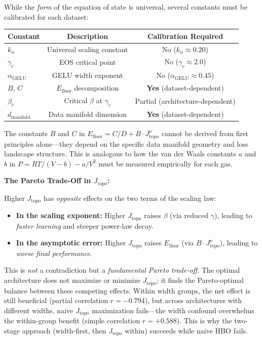 \documentclass[11pt, a4paper]{article}
\theoremstyle{plain}
\begin{document}
While the \emph{form} of the equation of state is universal, several constants must be calibrated for each dataset:

\begin{center}
\begin{tabular}{lcc}
\toprule
Constant & Description & Calibration Required \\
\midrule
$k_\alpha$ & Universal scaling constant & No ($k_\alpha \approx 0.20$) \\
$\gamma_c$ & EOS critical point & No ($\gamma_c \approx 2.0$) \\
$\alpha_{\mathrm{GELU}}$ & GELU width exponent & No ($\alpha_{\mathrm{GELU}} \approx 0.45$) \\
$B$, $C$ & $E_{\mathrm{floor}}$ decomposition & \textbf{Yes} (dataset-dependent) \\
$\beta_c$ & Critical $\beta$ at $\gamma_c$ & Partial (architecture-dependent) \\
$d_{\mathrm{manifold}}$ & Data manifold dimension & \textbf{Yes} (dataset-dependent) \\
\bottomrule
\end{tabular}
\end{center}

The constants $B$ and $C$ in $E_{\mathrm{floor}} = C/D + B \cdot J_{\mathrm{topo}}^{\nu}$ cannot be derived from first principles alone---they depend on the specific data manifold geometry and loss landscape structure. This is analogous to how the van der Waals constants $a$ and $b$ in $P = R T/(V-b) - a/V^2$ must be measured empirically for each gas.

\medskip\noindent\textbf{The Pareto Trade-Off in $J_{\mathrm{topo}}$:}

Higher $J_{\mathrm{topo}}$ has \emph{opposite} effects on the two terms of the scaling law:
\begin{itemize}
\item \textbf{In the scaling exponent:} Higher $J_{\mathrm{topo}}$ raises $\beta$ (via reduced $\gamma$), leading to \emph{faster learning} and steeper power-law decay.
\item \textbf{In the asymptotic error:} Higher $J_{\mathrm{topo}}$ raises $E_{\mathrm{floor}}$ (via $B \cdot J_{\mathrm{topo}}^{\nu}$), leading to \emph{worse final performance}.
\end{itemize}
This is \emph{not} a contradiction but a \emph{fundamental Pareto trade-off}. The optimal architecture does not maximize or minimize $J_{\mathrm{topo}}$; it finds the Pareto-optimal balance between these competing effects. Within width groups, the net effect is still beneficial (partial correlation $r = -0.794$), but across architectures with different widths, naive $J_{\mathrm{topo}}$ maximization fails---the width confound overwhelms the within-group benefit (simple correlation $r = +0.588$). This is why the two-stage approach (width-first, then $J_{\mathrm{topo}}$ within) succeeds while naive HBO fails.
\end{document}
